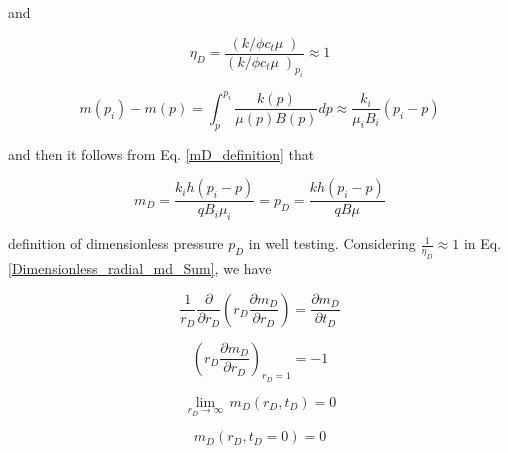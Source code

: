 \documentclass{llncs}
\numberwithin{equation}{section}
\numberwithin{figure}{section}
\numberwithin{table}{section}
\begin{document}
    and

    \begin{equation}
        {{\eta }_{D}}=\frac{\left( {k}/{\phi {{c}_{t}}\mu }\; \right)}{{{\left( {k}/{\phi {{c}_{t}}\mu }\; \right)}_{{{p}_{i}}}}}\approx 1
        \label{assumption}
    \end{equation}

    \begin{equation}
        m\left( {{p}_{i}} \right)-m\left( p \right)=\int_{p}^{{{p}_{i}}}{\frac{k\left( p \right)}{\mu \left( p \right)B\left( p \right)}dp\approx \frac{{{k}_{i}}}{{{\mu }_{i}}{{B}_{i}}}}\left( {{p}_{i}}-p \right)
        \label{assumption_2}
    \end{equation}

    and then it follows from Eq. \ref{mD_definition} that

    \begin{equation}
        {{m}_{D}}=\frac{{{k}_{i}}h\left( {{p}_{i}}-p \right)}{q{{B}_{i}}{{\mu }_{i}}}={{p}_{D}}=\frac{kh\left( {{p}_{i}}-p \right)}{qB\mu }
        \label{mD_to_pD}
    \end{equation}

     definition of dimensionless pressure $p_{D}$ in well testing.
    Considering $\frac{1}{{{\eta }_{D}}}\approx 1$ in Eq. \ref{Dimensionless_radial_md_Sum}, we have

    \begin{equation}
        \frac{1}{{{r}_{D}}}\frac{\partial }{\partial {{r}_{D}}}\left( {{r}_{D}}\frac{\partial {{m}_{D}}}{\partial {{r}_{D}}} \right)=\frac{\partial {{m}_{D}}}{\partial {{t}_{D}}}
        \label{Dimensionless_radial_md_Sum_lin}
    \end{equation}

    \begin{equation}
        {{\left( {{r}_{D}}\frac{\partial {{m}_{D}}}{\partial {{r}_{D}}} \right)}_{{{r}_{D}}=1}}=-1
        \label{Boundary_1_sum_lin}
    \end{equation}

    \begin{equation}
        \underset{{{r}_{D}}\to \infty }{\mathop{\lim }}\,{{m}_{D}}\left( {{r}_{D}},{{t}_{D}} \right)=0
        \label{Boundary_2_sum_lin}
    \end{equation}

    \begin{equation}
        {{m}_{D}}\left( {{r}_{D}},{{t}_{D}}=0 \right)=0
        \label{Initial_con_sum_lin}
    \end{equation}
\end{document}
